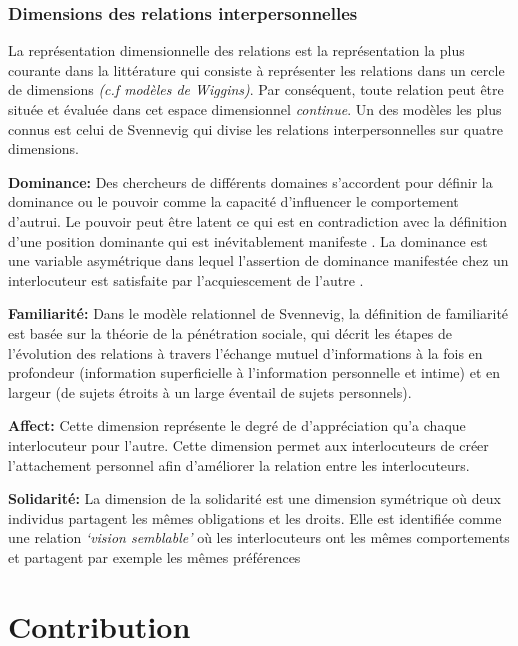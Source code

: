 \documentclass[a4paper,french]{article}
\begin{document}
\subsubsection{Dimensions des relations interpersonnelles}
La représentation dimensionnelle des relations est la représentation la plus courante dans la littérature qui consiste à représenter les relations dans un cercle de dimensions \emph{(c.f modèles de Wiggins)}. Par conséquent, toute relation peut être située et évaluée dans cet espace dimensionnel \textit{continue}. Un des modèles les plus connus est celui de Svennevig \cite{svennevig2000getting} qui divise les relations interpersonnelles sur quatre dimensions. 
\par \textbf{Dominance: } Des chercheurs de différents domaines s'accordent pour définir la dominance ou le pouvoir comme la capacité d'influencer le comportement d'autrui. Le pouvoir peut être latent \cite{komter1989hidden} ce qui est en contradiction avec la définition d'une position dominante qui est inévitablement manifeste \cite{dunbar2005perceptions}. La dominance est une variable asymétrique dans lequel l'assertion de dominance manifestée chez un interlocuteur est satisfaite par l'acquiescement de l'autre \cite{rogers1979domineeringness}.

\par \textbf{Familiarité: } Dans le modèle relationnel de Svennevig, la définition de familiarité est basée sur la théorie de la pénétration sociale, qui décrit les étapes de l'évolution des relations à travers l'échange mutuel d'informations à la fois en profondeur (information superficielle à l'information personnelle et intime) et en largeur (de sujets étroits à un large éventail de sujets personnels).

\par \textbf{Affect: } Cette dimension représente le degré de d'appréciation qu'a chaque interlocuteur pour l'autre. Cette dimension permet aux interlocuteurs de créer l'attachement personnel afin d'améliorer la relation entre les interlocuteurs\cite{nicholson2001role}.
	
\par \textbf{Solidarité: } La dimension de la solidarité est une dimension symétrique où deux individus partagent les mêmes obligations et les droits. Elle est identifiée comme une  relation  \emph{‘vision semblable’} où les interlocuteurs ont les mêmes comportements et partagent par exemple les mêmes préférences
\section{Contribution}
\label{contribution}
\end{document}
